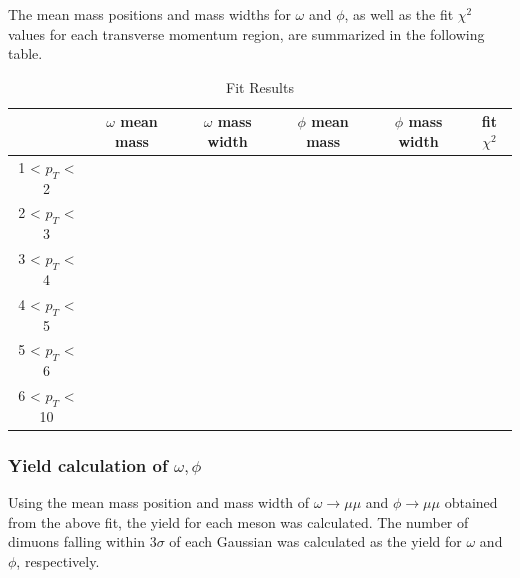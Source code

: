                 The mean mass positions and mass widths for $\omega$ and $\phi$, as well as the fit $\chi^2$ values for each transverse momentum region, are summarized in the following table.
                    \begin{table}[htbp]
                        \centering
                        \caption{Fit Results}
                        \begin{tabular}{|c||c|c|c|c|c|}
                            \hline
                            & $\omega$ mean mass & $\omega$ mass width & $\phi$ mean mass & $\phi$ mass width & fit $\chi^2$ \\ \hline \hline
                            1 < $p_{T}$ < 2 &  & & & &\\ \hline
                            2 < $p_{T}$ < 3 &  & & & &\\ \hline
                            3 < $p_{T}$ < 4 &  & & & &\\ \hline
                            4 < $p_{T}$ < 5 &  & & & &\\ \hline
                            5 < $p_{T}$ < 6 &  & & & &\\ \hline
                            6 < $p_{T}$ < 10 &  & & & &\\ \hline
                                
                        \end{tabular}
                        \label{Analysis:Dimuon:Yield:Fit_Results}
                    \end{table}
                    \subsubsection{Yield calculation of $\omega,\phi$} 
                    Using the mean mass position and mass width of $\omega \rightarrow \mu\mu$ and $\phi \rightarrow \mu\mu$ obtained from the above fit, the yield for each meson was calculated. The number of dimuons falling within 3$\sigma$ of each Gaussian was calculated as the yield for $\omega$ and $\phi$, respectively.
                \newpage
